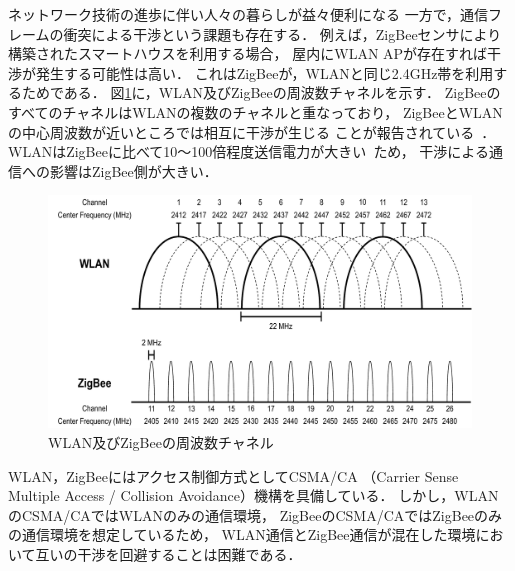 \documentclass[technicalreport]{ieicej}
\begin{document}
ネットワーク技術の進歩に伴い人々の暮らしが益々便利になる
一方で，通信フレームの衝突による干渉という課題も存在する．
例えば，ZigBeeセンサにより構築されたスマートハウスを利用する場合，
屋内にWLAN APが存在すれば干渉が発生する可能性は高い．
これはZigBeeが，WLANと同じ2.4GHz帯を利用するためである．
図\ref{fig:frequency}に，WLAN及びZigBeeの周波数チャネルを示す．
ZigBeeのすべてのチャネルはWLANの複数のチャネルと重なっており，
ZigBeeとWLANの中心周波数が近いところでは相互に干渉が生じる
ことが報告されている~\cite{Shuaib06:}．
WLANはZigBeeに比べて10〜100倍程度送信電力が大きい~\cite{Shuaib06:}ため，
干渉による通信への影響はZigBee側が大きい．

\begin{figure}[bt]
 \centering
 \includegraphics[width=\columnwidth]{figure/frequency.pdf}
 \caption{WLAN及びZigBeeの周波数チャネル}
 \label{fig:frequency}
\end{figure}

WLAN，ZigBeeにはアクセス制御方式としてCSMA/CA
（Carrier Sense Multiple Access / Collision Avoidance）機構を具備している．
しかし，WLANのCSMA/CAではWLANのみの通信環境，
ZigBeeのCSMA/CAではZigBeeのみの通信環境を想定しているため，
WLAN通信とZigBee通信が混在した環境において互いの干渉を回避することは困難である．
\end{document}
